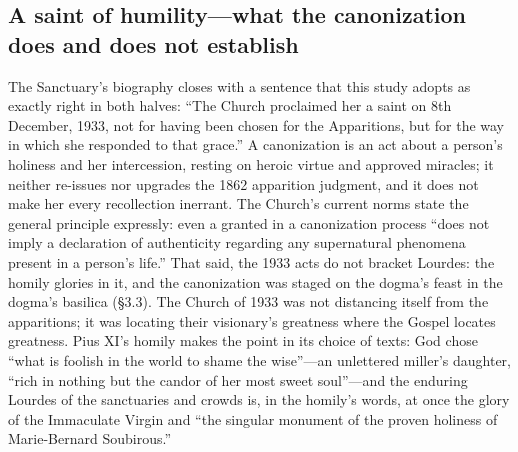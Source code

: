\subsection{A saint of humility---what the canonization does and
does not establish}

The Sanctuary's biography closes with a sentence that this study
adopts as exactly right in both halves: ``The Church proclaimed
her a saint on 8th December, 1933, not for having been chosen for
the Apparitions, but for the way in which she responded to that
grace.'' A
canonization is an act about a person's holiness and her
intercession, resting on heroic virtue and approved miracles; it
neither re-issues nor upgrades the 1862 apparition judgment, and
it does not make her every recollection inerrant. The Church's
current norms state the general principle expressly: even a
 granted in a canonization process ``does not
imply a declaration of authenticity regarding any supernatural
phenomena present in a person's life.'' That said, the 1933 acts do not bracket Lourdes: the
homily glories in it, and the canonization was staged on the
dogma's feast in the dogma's basilica (\S3.3). The Church of 1933
was not distancing itself from the apparitions; it was locating
their visionary's greatness where the Gospel locates greatness.
Pius XI's homily makes the point in its choice of texts: God
chose ``what is foolish in the world to shame the wise''---an
unlettered miller's daughter, ``rich in nothing but the candor of
her most sweet soul''---and the enduring Lourdes of the
sanctuaries and crowds is, in the homily's words, at once the
glory of the Immaculate Virgin and ``the singular monument of the
proven holiness of Marie-Bernard Soubirous.''

